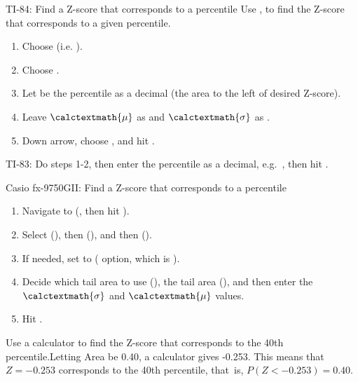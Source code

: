 \begin{onebox}{ TI-84: Find a Z-score that corresponds to a percentile}
\label{invNorm}
Use  ,  to find the Z-score that corresponds to a given percentile.
\begin{enumerate}
\setlength{\itemsep}{0mm}
\item Choose   (i.e. ).
\item Choose .
\item Let  be the percentile as a decimal (the area to the left of desired Z-score).
\item Leave $\calctextmath{\mu}$ as  and $\calctextmath{\sigma}$ as .
\item Down arrow, choose , and hit .\vspace{-1.5mm}
\end{enumerate}
TI-83: Do steps 1-2, then enter the percentile as a decimal, e.g.~\mbox{,} then hit .\end{onebox}

\begin{onebox}{ Casio fx-9750GII: Find a Z-score that corresponds to a percentile}
\begin{enumerate}
\setlength{\itemsep}{0mm}
\setlength{\itemsep}{0mm}
\item Navigate to  (, then hit ).
\item Select  (), then  (), and then  ().
\item If needed, set  to  ( option, which is ).
\item Decide which tail area to use (), the tail area (), and then enter the $\calctextmath{\sigma}$ and $\calctextmath{\mu}$ values.
\item Hit .
\end{enumerate}
\end{onebox}

\begin{examplewrap}
\begin{nexample}{Use a calculator to find the Z-score that corresponds to the 40th percentile.}Letting Area be 0.40, a calculator gives -0.253. This means that $Z = -0.253$ corresponds to the 40th percentile, that~is, $P(Z < -0.253) = 0.40$.
\end{nexample}
\end{examplewrap}

